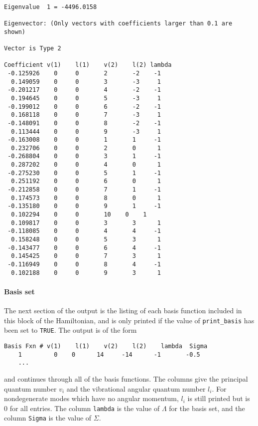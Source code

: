 \documentclass{article}
\begin{document}
\begin{verbatim}
 
Eigenvalue	1 = -4496.0158 

Eigenvector: (Only vectors with coefficients larger than 0.1 are shown)
 
Vector is Type 2
 
Coefficient	v(1)	l(1)	v(2)	l(2) lambda	
 -0.125926	  0	  	0	  	2	 	-2	  -1	
  0.149059	  0	  	0	  	3	 	-3	   1	
 -0.201217	  0	  	0	  	4	 	-2	  -1	
  0.194645	  0	  	0	  	5	 	-3	   1	
 -0.199012	  0	  	0	  	6	 	-2	  -1	
  0.168118	  0	  	0	  	7	 	-3	   1	
 -0.148091	  0	  	0	  	8	 	-2	  -1	
  0.113444	  0	  	0	  	9	 	-3	   1	
 -0.163008	  0	  	0	  	1	  	1	  -1	
  0.232706	  0	  	0	  	2	  	0	   1	
 -0.268804	  0	  	0	  	3	  	1	  -1	
  0.287202	  0	  	0	  	4	  	0	   1	
 -0.275230	  0	  	0	  	5	  	1	  -1	
  0.251192	  0	  	0	  	6	  	0	   1	
 -0.212858	  0	  	0	  	7	  	1	  -1	
  0.174573	  0	  	0	  	8	  	0	   1	
 -0.135180	  0	  	0	  	9	  	1	  -1	
  0.102294	  0	  	0	  	10	  0	   1	
  0.109817	  0	  	0	  	3	  	3	   1	
 -0.118085	  0	  	0	  	4	  	4	  -1	
  0.158248	  0	  	0	  	5	  	3	   1	
 -0.143477	  0	  	0	  	6	  	4	  -1	
  0.145425	  0	  	0	  	7	  	3	   1	
 -0.116949	  0	  	0	  	8	  	4	  -1	
  0.102188	  0	  	0	  	9	  	3	   1

\end{verbatim}

\paragraph{Basis set}
The next section of the output is the listing of each basis function
included in this block of the Hamiltonian, and is only printed if the
value of {\tt print\_basis} has been set to {\tt TRUE}. The output is of
the form
\begin{verbatim}
Basis Fxn #	v(1)	l(1)	v(2)	l(2)	lambda	Sigma	
    1         0	   0	  14	 -14	  -1	   -0.5	
	...	
\end{verbatim}
and continues through all of the basis functions. The columns give the
principal quantum number $v_i$ and the vibrational angular quantum
number $l_i$. For nondegenerate modes which have no angular momentum, $l_i$ is still printed but is 0 for all entries. The column {\tt lambda} is the value of $\Lambda $ for
the basis set, and the column {\tt Sigma} is the value of
$\Sigma $.
\end{document}
